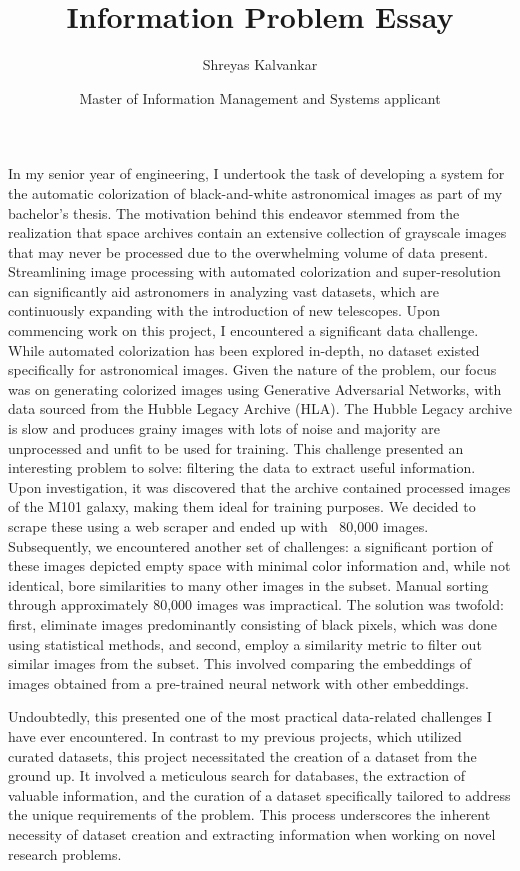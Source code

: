 \documentclass[11pt]{article}
\title{Information Problem Essay}
\author{Shreyas Kalvankar}
\date{Master of Information Management and Systems applicant}
\begin{document}
  \maketitle%
  \thispagestyle{empty}
  \vspace{16pt}

\hspace{0.25in}In my senior year of engineering, I undertook the task of
developing a system for the automatic colorization of black-and-white
astronomical images as part of my bachelor’s thesis. The motivation behind this
endeavor stemmed from the realization that space archives contain an extensive
collection of grayscale images that may never be processed due to the
overwhelming volume of data present. Streamlining image processing with
automated colorization and super-resolution can significantly aid astronomers in
analyzing vast datasets, which are continuously expanding with the introduction
of new telescopes. Upon commencing work on this project, I encountered a
significant data challenge. While automated colorization has been explored
in-depth, no dataset existed specifically for astronomical images. Given the
nature of the problem, our focus was on generating colorized images using
Generative Adversarial Networks, with data sourced from the Hubble Legacy
Archive (HLA).  The Hubble Legacy archive is slow and produces grainy images
with lots of noise and majority are unprocessed and unfit to be used for
training. This challenge presented an interesting problem to solve: filtering
the data to extract useful information. Upon investigation, it was discovered
that the archive contained processed images of the M101 galaxy, making them
ideal for training purposes. We decided to scrape these using a web scraper and
ended up with ~80,000 images. Subsequently, we encountered another set of
challenges: a significant portion of these images depicted empty space with
minimal color information and, while not identical, bore similarities to many
other images in the subset. Manual sorting through approximately 80,000 images
was impractical.  The solution was twofold: first, eliminate images
predominantly consisting of black pixels, which was done using statistical
methods, and second, employ a similarity metric to filter out similar images
from the subset. This involved comparing the embeddings of images obtained from
a pre-trained neural network with other embeddings.

\hspace{0.25in}Undoubtedly, this presented one of the most practical
data-related challenges I have ever encountered. In contrast to my previous
projects, which utilized curated datasets, this project necessitated the
creation of a dataset from the ground up. It involved a meticulous search for
databases, the extraction of valuable information, and the curation of a dataset
specifically tailored to address the unique requirements of the problem. This
process underscores the inherent necessity of dataset creation and extracting
information when working on novel research problems.
\end{document}
